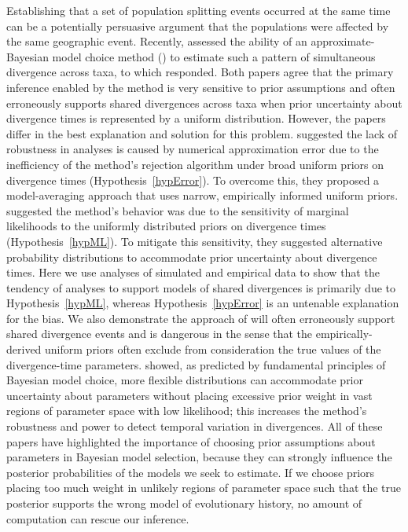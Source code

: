 Establishing that a set of population splitting events occurred at the same
time can be a potentially persuasive argument that the populations were
affected by the same geographic event.
Recently, \citet{Oaks2012} assessed the ability of an approximate-Bayesian
model choice method (\msb) to estimate such a pattern of simultaneous
divergence across taxa, to which \citet{Hickerson2013} responded.
Both papers agree that the primary inference enabled by the method is very
sensitive to prior assumptions and often erroneously supports shared
divergences across taxa when prior uncertainty about divergence times
is represented by a uniform distribution.
However, the papers differ in the best explanation and solution for this
problem.
\citet{Hickerson2013} suggested the lack of robustness in \msb analyses is
caused by numerical approximation error due to the inefficiency of the method's
rejection algorithm under broad uniform priors on divergence times
(Hypothesis~\ref{hypError}).
To overcome this, they proposed a model-averaging approach that uses narrow,
empirically informed uniform priors.
\citet{Oaks2012} suggested the method's behavior was due to the sensitivity of
marginal likelihoods to the uniformly distributed priors on divergence times
(Hypothesis~\ref{hypML}).
To mitigate this sensitivity, they suggested alternative probability
distributions to accommodate prior uncertainty about divergence times.
Here we use analyses of simulated and empirical data to show that the tendency
of \msb analyses to support models of shared divergences is primarily due to
Hypothesis~\ref{hypML}, whereas Hypothesis~\ref{hypError} is an untenable
explanation for the bias.
We also demonstrate the approach of \citet{Hickerson2013} will often
erroneously support shared divergence events and is dangerous in the sense that
the empirically-derived uniform priors often exclude from consideration the
true values of the divergence-time parameters.
\citep{Oaks2014dpp} showed, as predicted by fundamental principles of Bayesian
model choice, more flexible distributions can accommodate prior uncertainty
about parameters without placing excessive prior weight in vast regions of
parameter space with low likelihood; this increases the method's robustness and
power to detect temporal variation in divergences.
All of these papers have highlighted the importance of choosing prior
assumptions about parameters in Bayesian model selection, because they
can strongly influence the posterior probabilities of the models we seek
to estimate.
If we choose priors placing too much weight in unlikely regions of parameter
space such that the true posterior supports the wrong model of evolutionary
history, no amount of computation can rescue our inference. 
